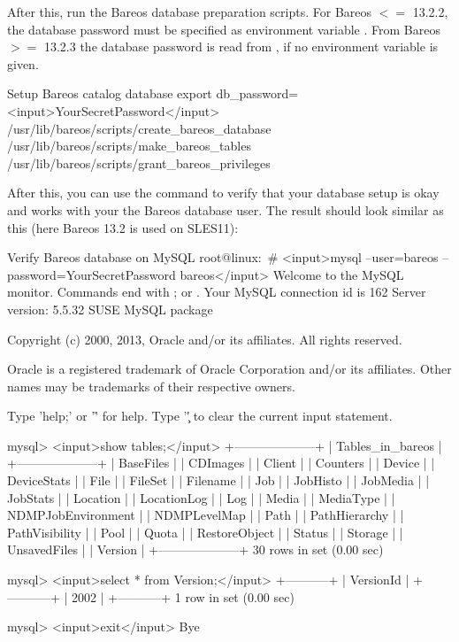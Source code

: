 After this, run the Bareos database preparation scripts.
For Bareos $<=$ 13.2.2, the database password must be specified as environment variable .
From Bareos $>=$ 13.2.3 the database password is read from \configFileDirUnix, if no environment variable is given.

\begin{commands}{Setup Bareos catalog database}
export db_password=<input>YourSecretPassword</input>
/usr/lib/bareos/scripts/create_bareos_database
/usr/lib/bareos/scripts/make_bareos_tables
/usr/lib/bareos/scripts/grant_bareos_privileges
\end{commands}

After this, you can use the  command to verify that your database setup is okay
and works with your the Bareos database user.
The result should look similar as this (here Bareos 13.2 is used on SLES11):

\begin{commands}{Verify Bareos database on MySQL}
root@linux:~# <input>mysql --user=bareos --password=YourSecretPassword bareos</input>
Welcome to the MySQL monitor.  Commands end with ; or \g.
Your MySQL connection id is 162
Server version: 5.5.32 SUSE MySQL package

Copyright (c) 2000, 2013, Oracle and/or its affiliates. All rights reserved.

Oracle is a registered trademark of Oracle Corporation and/or its
affiliates. Other names may be trademarks of their respective
owners.

Type 'help;' or '\h' for help. Type '\c' to clear the current input statement.

mysql> <input>show tables;</input>
+--------------------+
| Tables_in_bareos   |
+--------------------+
| BaseFiles          |
| CDImages           |
| Client             |
| Counters           |
| Device             |
| DeviceStats        |
| File               |
| FileSet            |
| Filename           |
| Job                |
| JobHisto           |
| JobMedia           |
| JobStats           |
| Location           |
| LocationLog        |
| Log                |
| Media              |
| MediaType          |
| NDMPJobEnvironment |
| NDMPLevelMap       |
| Path               |
| PathHierarchy      |
| PathVisibility     |
| Pool               |
| Quota              |
| RestoreObject      |
| Status             |
| Storage            |
| UnsavedFiles       |
| Version            |
+--------------------+
30 rows in set (0.00 sec)

mysql> <input>select * from Version;</input>
+-----------+
| VersionId |
+-----------+
|      2002 |
+-----------+
1 row in set (0.00 sec)

mysql> <input>exit</input>
Bye
\end{commands}


